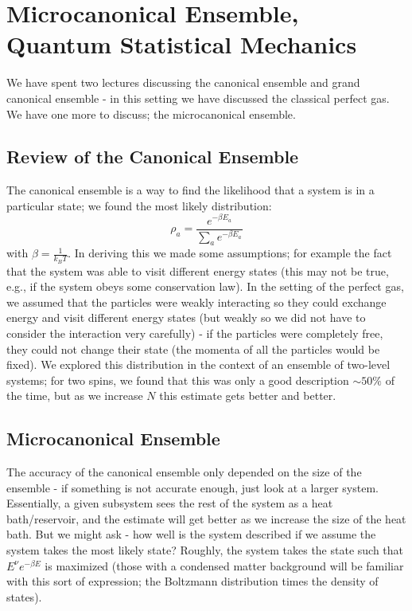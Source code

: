 \section{Microcanonical Ensemble, Quantum Statistical Mechanics}
We have spent two lectures discussing the canonical ensemble and grand canonical ensemble - in this setting we have discussed the classical perfect gas. We have one more to discuss; the microcanonical ensemble.

\subsection{Review of the Canonical Ensemble}
The canonical ensemble is a way to find the likelihood that a system is in a particular state; we found the most likely distribution:
\begin{equation}
    \rho_a = \frac{e^{-\beta E_a}}{\sum_a e^{-\beta E_a}}
\end{equation}
with $\beta = \frac{1}{k_B T}$. In deriving this we made some assumptions; for example the fact that the system was able to visit different energy states (this may not be true, e.g., if the system obeys some conservation law). In the setting of the perfect gas, we assumed that the particles were weakly interacting so they could exchange energy and visit different energy states (but weakly so we did not have to consider the interaction very carefully) - if the particles were completely free, they could not change their state (the momenta of all the particles would be fixed). We explored this distribution in the context of an ensemble of two-level systems; for two spins, we found that this was only a good description $\sim 50\%$ of the time, but as we increase $N$ this estimate gets better and better.

\subsection{Microcanonical Ensemble}
The accuracy of the canonical ensemble only depended on the size of the ensemble - if something is not accurate enough, just look at a larger system. Essentially, a given subsystem sees the rest of the system as a heat bath/reservoir, and the estimate will get better as we increase the size of the heat bath. But we might ask - how well is the system described if we assume the system takes the most likely state? Roughly, the system takes the state such that $E^\nu e^{-\beta E}$ is maximized (those with a condensed matter background will be familiar with this sort of expression; the Boltzmann distribution times the density of states).


